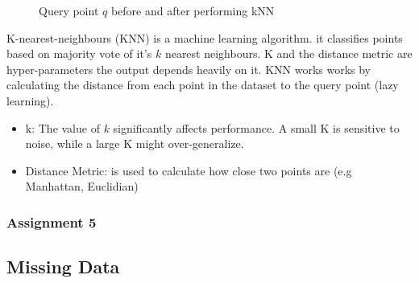 \documentclass[12pt]{article}
\begin{document}
\begin{figure}[H]
\caption{Query point $q$ before and after performing kNN}
\end{figure}
K-nearest-neighbours (KNN) is a machine learning algorithm. it classifies points based on majority vote of it's $k$ nearest neighbours. K and the distance metric are hyper-parameters the output depends heavily on it. KNN works works by calculating the distance from each point in the dataset to the query point (lazy learning). \\
\begin{itemize}
    \item k: The value of $k$ significantly affects performance. A small K is sensitive to noise, while a large K might over-generalize.
    \item Distance Metric: is used to calculate how close two points are (e.g Manhattan, Euclidian)
\end{itemize}

\newpage 
\subsubsection{Assignment 5}
\subsection{Missing Data}
\end{document}

